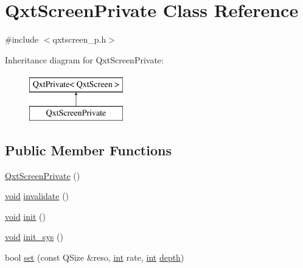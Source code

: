 \hypertarget{class_qxt_screen_private}{\section{Qxt\-Screen\-Private Class Reference}
\label{class_qxt_screen_private}
}


{\ttfamily \#include $<$qxtscreen\-\_\-p.\-h$>$}

Inheritance diagram for Qxt\-Screen\-Private\-:\begin{figure}[H]
\begin{center}
\leavevmode
\includegraphics[height=2.000000cm]{class_qxt_screen_private}
\end{center}
\end{figure}
\subsection*{Public Member Functions}
\begin{DoxyCompactItemize}
\item 
\hyperlink{class_qxt_screen_private_a6ab51530b1ce6cd025313287627bf209}{Qxt\-Screen\-Private} ()
\item 
\hyperlink{group___u_a_v_objects_plugin_ga444cf2ff3f0ecbe028adce838d373f5c}{void} \hyperlink{class_qxt_screen_private_a8e52f7c334face4b869725addb2f22b0}{invalidate} ()
\item 
\hyperlink{group___u_a_v_objects_plugin_ga444cf2ff3f0ecbe028adce838d373f5c}{void} \hyperlink{class_qxt_screen_private_ad8d209ac2afa1f6175990cf23121ccfa}{init} ()
\item 
\hyperlink{group___u_a_v_objects_plugin_ga444cf2ff3f0ecbe028adce838d373f5c}{void} \hyperlink{class_qxt_screen_private_af51f2b5fbd8b3affd9aa87c5dd778bf7}{init\-\_\-sys} ()
\item 
bool \hyperlink{class_qxt_screen_private_a2438ad86660134fdc6702f17eddc67b1}{set} (const Q\-Size \&reso, \hyperlink{ioapi_8h_a787fa3cf048117ba7123753c1e74fcd6}{int} rate, \hyperlink{ioapi_8h_a787fa3cf048117ba7123753c1e74fcd6}{int} \hyperlink{glext_8h_ab9dbe6fd459e0977873d5bfe29cec173}{depth})
\end{DoxyCompactItemize}
